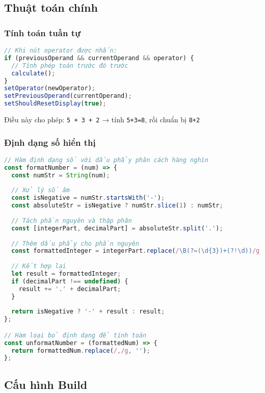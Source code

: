 \subsection{Thuật toán chính}

\subsubsection{Tính toán tuần tự}

\begin{lstlisting}[language=JavaScript, caption=Thuật toán tính toán tuần tự]
// Khi nút operator được nhấn:
if (previousOperand && currentOperand && operator) {
  // Tính phép toán trước đó trước
  calculate();
}
setOperator(newOperator);
setPreviousOperand(currentOperand);
setShouldResetDisplay(true);
\end{lstlisting}

Điều này cho phép: \texttt{5 + 3 + 2} → tính \texttt{5+3=8}, rồi chuẩn bị \texttt{8+2}

\subsubsection{Định dạng số hiển thị}

\begin{lstlisting}[language=JavaScript, caption=Hàm định dạng số]
// Hàm định dạng số với dấu phẩy phân cách hàng nghìn
const formatNumber = (num) => {
  const numStr = String(num);
  
  // Xử lý số âm
  const isNegative = numStr.startsWith('-');
  const absoluteStr = isNegative ? numStr.slice(1) : numStr;
  
  // Tách phần nguyên và thập phân
  const [integerPart, decimalPart] = absoluteStr.split('.');
  
  // Thêm dấu phẩy cho phần nguyên
  const formattedInteger = integerPart.replace(/\B(?=(\d{3})+(?!\d))/g, ',');
  
  // Kết hợp lại
  let result = formattedInteger;
  if (decimalPart !== undefined) {
    result += '.' + decimalPart;
  }
  
  return isNegative ? '-' + result : result;
};

// Hàm loại bỏ định dạng để tính toán
const unformatNumber = (formattedNum) => {
  return formattedNum.replace(/,/g, '');
};
\end{lstlisting}

\subsection{Cấu hình Build}

